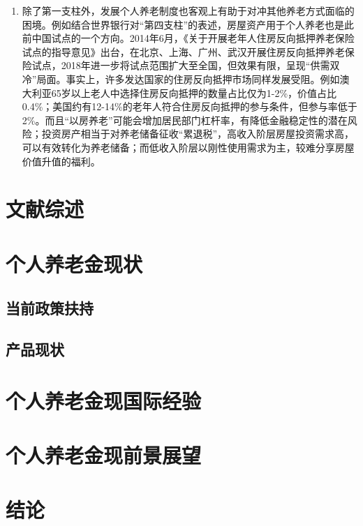 \documentclass[a4paper,12pt]{ctexart}
\begin{document}
\begin{enumerate}
    \item 除了第一支柱外，发展个人养老制度也客观上有助于对冲其他养老方式面临的困境。例如结合世界银行对“第四支柱”的表述，房屋资产用于个人养老也是此前中国试点的一个方向。2014年6月，《关于开展老年人住房反向抵押养老保险试点的指导意见》出台，在北京、上海、广州、武汉开展住房反向抵押养老保险试点，2018年进一步将试点范围扩大至全国，但效果有限，呈现“供需双冷”局面。事实上，许多发达国家的住房反向抵押市场同样发展受阻。例如澳大利亚65岁以上老人中选择住房反向抵押的数量占比仅为1-2\%，价值占比0.4\%\citep{productivity2015australia}；美国约有12-14\%的老年人符合住房反向抵押的参与条件，但参与率低于2\%\citep{warshawsky2017retire}。而且“以房养老”可能会增加居民部门杠杆率，有降低金融稳定性的潜在风险；投资房产相当于对养老储备征收“累退税”，高收入阶层房屋投资需求高，可以有效转化为养老储备；而低收入阶层以刚性使用需求为主，较难分享房屋价值升值的福利。
\end{enumerate}


\section*{文献综述}

\section*{个人养老金现状}
\subsection*{当前政策扶持}

\subsection*{产品现状}

\section*{个人养老金现国际经验}

\section*{个人养老金现前景展望}

\section*{结论}

\nocite{*}
\printbibliography[heading=bibliography,title=参考文献]
\end{document}
